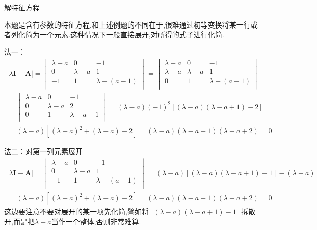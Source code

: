 \begin{examp}{解特征方程}

    \jie 本题是含有参数的特征方程,和上述例题的不同在于,很难通过初等变换将某一行或者列化简为一个元素.这种情况下一般直接展开,对所得的式子进行化简.

    法一：
    \begin{gather*}
        \vert \lambda \mathbf{I}-\mathbf{A} \vert=
        \begin{vmatrix}
            \lambda-a  &   0   &   -1   \\
            0   &   \lambda-a  &   1   \\
            -1   &   1   &   \lambda-(a-1)  \\        
        \end{vmatrix}=
        \begin{vmatrix}
            \lambda-a  &   0   &   -1   \\
            \lambda-a   &   \lambda-a  &   1   \\
            0   &   1   &   \lambda-(a-1)  \\        
        \end{vmatrix} \\
        =\begin{vmatrix}
            \lambda-a  &   0   &   -1   \\
            0   &   \lambda-a  &   2   \\
            0   &   1   &   \lambda-a+1  \\        
        \end{vmatrix}=(\lambda-a)(-1)^2\left[ (\lambda-a)(\lambda-a+1)-2 \right] \\
        =(\lambda-a)\left[ (\lambda-a)^2+(\lambda-a)-2 \right]=(\lambda-a)(\lambda-a-1)(\lambda-a+2)=0
    \end{gather*}

    法二：对第一列元素展开
    \begin{gather*}
        \vert \lambda \mathbf{I}-\mathbf{A} \vert=
        \begin{vmatrix}
            \lambda-a  &   0   &   -1   \\
            0   &   \lambda-a  &   1   \\
            -1   &   1   &   \lambda-(a-1)  \\        
        \end{vmatrix}=
        (\lambda-a)\left[ (\lambda-a)(\lambda-a+1)-1 \right]-(\lambda-a)\\
        =(\lambda-a)\left[ (\lambda-a)^2+(\lambda-a)-2 \right]=(\lambda-a)(\lambda-a-1)(\lambda-a+2)=0
    \end{gather*}
    这边要注意不要对展开的某一项先化简,譬如将$\left[ (\lambda-a)(\lambda-a+1)-1 \right]$拆散开,而是把$\lambda-a$当作一个整体,否则非常难算.

\end{examp}

